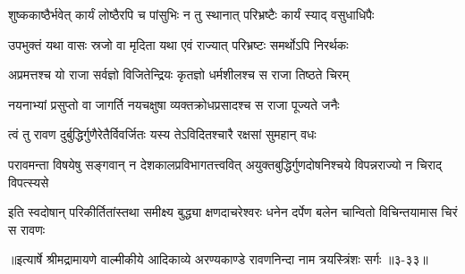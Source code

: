 \twolineshloka
{शुष्ककाष्ठैर्भवेत् कार्यं लोष्ठैरपि च पांसुभिः}
{न तु स्थानात् परिभ्रष्टैः कार्यं स्याद् वसुधाधिपैः} %

\twolineshloka
{उपभुक्तं यथा वासः स्रजो वा मृदिता यथा}
{एवं राज्यात् परिभ्रष्टः समर्थोऽपि निरर्थकः} %

\twolineshloka
{अप्रमत्तश्च यो राजा सर्वज्ञो विजितेन्द्रियः}
{कृतज्ञो धर्मशीलश्च स राजा तिष्ठते चिरम्} %

\twolineshloka
{नयनाभ्यां प्रसुप्तो वा जागर्ति नयचक्षुषा}
{व्यक्तक्रोधप्रसादश्च स राजा पूज्यते जनैः} %

\twolineshloka
{त्वं तु रावण दुर्बुद्धिर्गुणैरेतैर्विवर्जितः}
{यस्य तेऽविदितश्चारै रक्षसां सुमहान् वधः} %

\twolineshloka
{परावमन्ता विषयेषु सङ्गवान् न देशकालप्रविभागतत्त्ववित्}
{अयुक्तबुद्धिर्गुणदोषनिश्चये विपन्नराज्यो न चिराद् विपत्स्यसे} %

\twolineshloka
{इति स्वदोषान् परिकीर्तितांस्तथा समीक्ष्य बुद्ध्या क्षणदाचरेश्वरः}
{धनेन दर्पेण बलेन चान्वितो विचिन्तयामास चिरं स रावणः} %


॥इत्यार्षे श्रीमद्रामायणे वाल्मीकीये आदिकाव्ये अरण्यकाण्डे रावणनिन्दा नाम त्रयस्त्रिंशः सर्गः ॥३-३३॥
